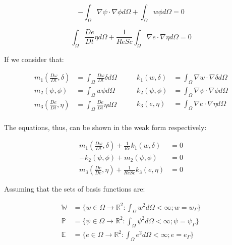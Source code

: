 \begin{equation} \label{stream weak}
 - \int_{\Omega} \nabla \psi \cdot \nabla \phi d\Omega
 + \int_{\Omega} w \phi d\Omega = 0
\end{equation}

\begin{equation} \label{concentration weak} 
   \int_{\Omega} \frac{D e}{Dt} \eta d\Omega
 + \frac{1}{\textit{ReSc}} \int_{\Omega} \nabla e \cdot \nabla \eta d\Omega 
 = 0
\end{equation}


\medskip
\noindent
If we consider that:

\begin{equation}
 \begin{aligned}
  \textbf{$m_1$}(\frac{D \omega}{Dt},\delta) & = \int_{\Omega} \frac{D \omega}{Dt} \delta d\Omega \\ 
  \textbf{$m_2$}(\psi,\phi) & = \int_{\Omega} w \phi d\Omega \\
  \textbf{$m_3$}(\frac{De}{Dt},\eta) & = \int_{\Omega} \frac{De}{Dt} \eta d\Omega \\
 \end{aligned}
 \qquad
 \begin{aligned}  
  \textbf{$k_1$}(w,\delta) & = \int_{\Omega} \nabla w \cdot \nabla \delta d\Omega \\
  \textbf{$k_2$}(\psi,\phi) & = \int_{\Omega} \nabla \psi \cdot \nabla \phi d\Omega \\
  \textbf{$k_3$}(e,\eta) & = \int_{\Omega} \nabla e \cdot \nabla \eta d\Omega \\
 \end{aligned}
\end{equation}

\noindent
The equations, thus, can be shown in the weak form respectively:

\begin{align}
 \textbf{$m_1$}(\frac{D \omega}{Dt},\delta) 
 + \frac{1}{\textit{Re}}\textbf{$k_1$}(w,\delta) 
 & = 0 \\
 - \textbf{$k_2$}(\psi,\phi) 
 + \textbf{$m_2$}(\psi,\phi) 
 & = 0 \\
 \textbf{$m_3$}(\frac{De}{De},\eta) 
 + \frac{1}{\textit{ReSc}}\textbf{$k_3$}(e,\eta) 
 & = 0
\end{align}


\noindent
Assuming that the sets of basis functions are:

\begin{equation}
 \begin{aligned}
  \mathbb{W} &= \{w \in \Omega \rightarrow \mathbb{R}^2
  : \int_\Omega w^2 d\Omega < \infty 
  ; w = w_\Gamma\} \\
  \mathbb{P} &= \{\psi \in \Omega \rightarrow \mathbb{R}^2
  : \int_\Omega \psi^2 d\Omega < \infty 
  ; \psi = \psi_\Gamma\} \\
  \mathbb{E} &= \{e \in \Omega \rightarrow \mathbb{R}^2
  : \int_\Omega e^2 d\Omega < \infty 
  ; e = e_\Gamma\}
 \end{aligned}
\end{equation}

